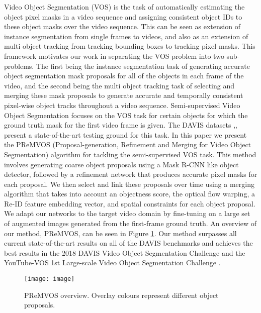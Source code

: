 \documentclass[runningheads]{llncs}
\begin{document}
Video Object Segmentation (VOS) is the task of automatically estimating the object pixel masks in a video sequence and assigning consistent object IDs to these object masks over the video sequence. This can be seen as extension of instance segmentation from single frames to videos, and also as an extension of multi object tracking from tracking bounding boxes to tracking pixel masks. This framework motivates our work in separating the VOS problem into two sub-problems. The first being the instance segmentation task of generating accurate object segmentation mask proposals for all of the objects in each frame of the video, and the second being the multi object tracking task of selecting and merging these mask proposals to generate accurate and temporally consistent pixel-wise object tracks throughout a video sequence. Semi-supervised Video Object Segmentation focuses on the VOS task for certain objects for which the ground truth mask for the first video frame is given. The DAVIS datasets \cite{Caelles_arXiv_2018},\cite{Pont-Tuset_arXiv_2017},\cite{Perazzi2016} present a state-of-the-art testing ground for this task.
In this paper we present the PReMVOS (Proposal-generation, Refinement and Merging for Video Object Segmentation) algorithm for tackling the semi-supervised VOS task.  This method involves generating coarse object proposals using a Mask R-CNN like object detector, followed by a refinement network that produces accurate pixel masks for each proposal. We then select and link these proposals over time using a merging algorithm that takes into account an objectness score, the optical flow warping, a Re-ID feature embedding vector, and spatial constraints for each object proposal. We adapt our networks to the target video domain by fine-tuning on a large set of augmented images generated from the first-frame ground truth. An overview of our method, PReMVOS, can be seen in Figure \ref{fig:image}. Our method surpasses all current state-of-the-art results on all of the DAVIS benchmarks and achieves the best results in the 2018 DAVIS Video Object Segmentation Challenge \cite{DAVIS2018-Semi-Supervised-1st} and the YouTube-VOS 1st Large-scale Video Object Segmentation Challenge \cite{Luiten18ECCVW}.


\begin{figure}[t!]
  \centering
    \texttt{[image: image]}
  \caption{PReMVOS overview. Overlay colours represent different object proposals.}
  \label{fig:image}
\end{figure}
\end{document}

